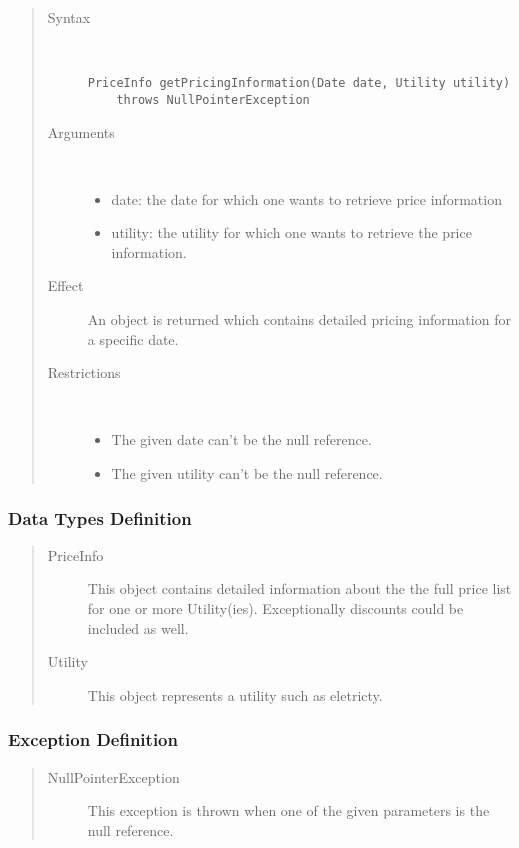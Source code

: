\begin{quote}
	\begin{description}
		\item[Syntax] \
		\begin{verbatim}
PriceInfo getPricingInformation(Date date, Utility utility)
    throws NullPointerException
		\end{verbatim}
		\item[Arguments] \
		\begin{itemize}
		  \item date: the date for which one wants to retrieve price information
		  \item utility: the utility for which one wants to retrieve the price
		  information.
		\end{itemize}
		\item[Effect] An object is returned which contains detailed pricing
		information for a specific date.
		\item[Restrictions] \
		\begin{itemize}
		  \item The given date can't be the null reference.
		  \item The given utility can't be the null reference.
		\end{itemize}
	\end{description} 
\end{quote}

\subsubsection{Data Types Definition}

\begin{quote}
	\begin{description}
		\item[PriceInfo] This object contains detailed information about the
		the full price list for one or more Utility(ies). Exceptionally discounts
		could be included as well.
		\item[Utility] This object represents a utility such as eletricty.
	\end{description} 
\end{quote}

\subsubsection{Exception Definition} 

\begin{quote}
	\begin{description}
		\item[NullPointerException] This exception is thrown when one of the given
		parameters is the null reference.
	\end{description} 
\end{quote}
